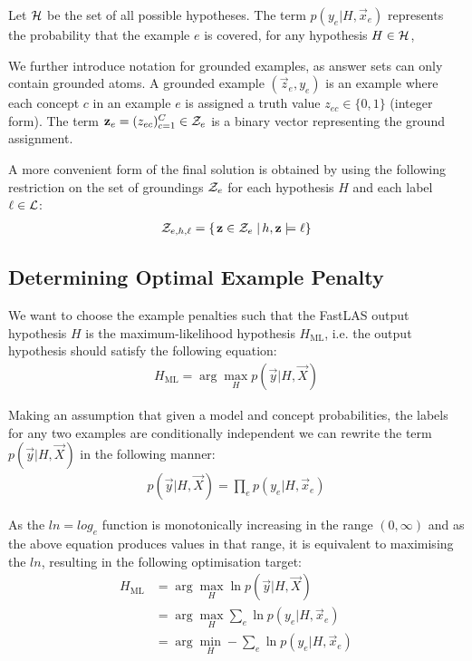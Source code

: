 Let $\mathcal{H}$ be the set of all possible hypotheses. The term $p(y_e|H, \vec{x}_{e})$ represents the probability that the example $e$ is covered, for any hypothesis $H \in \mathcal{H}$,


We further introduce notation for grounded examples, as answer sets can only contain grounded atoms.
A grounded example $(\vec{z}_e, y_e)$ is an example where each concept $c$ in an example $e$ is assigned a truth value $z_{ec} \in \{0,1\}$ (integer form). 
The term $\textbf{z}_e = (z_{ec})_{c=1}^C \in \mathcal{Z}_e$  is a binary vector representing the ground assignment. 

A more convenient form of the final solution is obtained by using the following restriction on the set of groundings $\mathcal{Z}_e$ for each hypothesis $H$ and each label $\ell \in \mathcal{L}$:
\begin{align}
\mathcal{Z}_{e,h,\ell} = \left\{\left. \textbf{z} \in \mathcal{Z}_e \; \right | h, \textbf{z} \models \ell \right\}
\end{align}

\subsection{Determining Optimal Example Penalty}

We want to choose the example penalties such that the FastLAS output hypothesis $H$ is the maximum-likelihood hypothesis $H_{\text{ML}}$, i.e. the output hypothesis should satisfy the following equation:
\begin{align}
H_{\text{ML}} = \arg\max_{H}
p(\vec{y}|H, \vec{X})
\end{align}

Making an assumption that given a model and concept probabilities, the labels for any two examples are conditionally independent we can rewrite the term $p(\vec{y}|H, \vec{X})$ in the following manner:
\begin{align}
p(\vec{y}|H, \vec{X})
= \prod_{e} p(y_e|H, \vec{x}_e)
\end{align}


As the $ln = log_e$ function is monotonically increasing in the range $(0, \infty)$ and as the above equation produces values in that range, it is equivalent to maximising the $ln$, resulting in the following optimisation target:
\begin{align}
H_{\text{ML}}
& = \arg\max_{H}
\ln p(\vec{y}|H, \vec{X}) \nonumber \\
& = \arg\max_{H}
\sum_{e} \ln p(y_e|H, \vec{x}_e) \nonumber \\
& = \arg\min_{H}
-\sum_{e} \ln p(y_e|H, \vec{x}_e)
\end{align}


